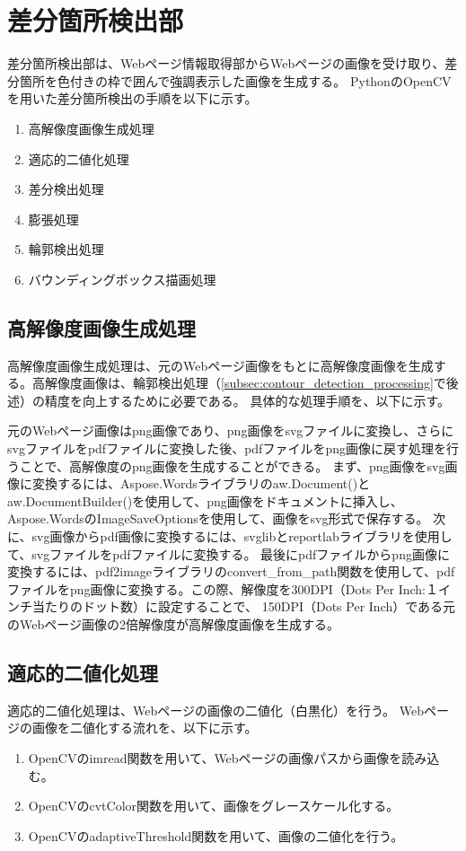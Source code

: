 \section{差分箇所検出部}\label{sec:Difference_extraction_section}
差分箇所検出部は、Webページ情報取得部からWebページの画像を受け取り、差分箇所を色付きの枠で囲んで強調表示した画像を生成する。
PythonのOpenCV\cite{OpenCV}を用いた差分箇所検出の手順を以下に示す。
\begin{enumerate}
    \item 高解像度画像生成処理
    \item 適応的二値化処理
    \item 差分検出処理
    \item 膨張処理
    \item 輪郭検出処理
    \item バウンディングボックス描画処理
\end{enumerate}

\subsection{高解像度画像生成処理}\label{subsec:Generate_high_images}
高解像度画像生成処理は、元のWebページ画像をもとに高解像度画像を生成する。高解像度画像は、輪郭検出処理（\ref{subsec:contour_detection_processing}で後述）の精度を向上するために必要である。
具体的な処理手順を、以下に示す。

元のWebページ画像はpng画像であり、png画像をsvgファイルに変換し、さらにsvgファイルをpdfファイルに変換した後、pdfファイルをpng画像に戻す処理を行うことで、高解像度のpng画像を生成することができる。
まず、png画像をsvg画像に変換するには、Aspose.Wordsライブラリのaw.Document()とaw.DocumentBuilder()を使用して、png画像をドキュメントに挿入し、Aspose.WordsのImageSaveOptionsを使用して、画像をsvg形式で保存する。
次に、svg画像からpdf画像に変換するには、svglibとreportlabライブラリを使用して、svgファイルをpdfファイルに変換する。
最後にpdfファイルからpng画像に変換するには、pdf2imageライブラリのconvert\_from\_path関数を使用して、pdfファイルをpng画像に変換する。この際、解像度を300DPI（Dots Per Inch:１インチ当たりのドット数）に設定することで、
150DPI（Dots Per Inch）である元のWebページ画像の2倍解像度が高解像度画像を生成する。


\subsection{適応的二値化処理}\label{subsec:Adaptive_Binarisation}
適応的二値化処理は、Webページの画像の二値化（白黒化）を行う。
Webページの画像を二値化する流れを、以下に示す。
\begin{enumerate}
    \item OpenCVのimread関数を用いて、Webページの画像パスから画像を読み込む。
    \item OpenCVのcvtColor関数を用いて、画像をグレースケール化する。
    \item OpenCVのadaptiveThreshold関数を用いて、画像の二値化を行う。
\end{enumerate}


